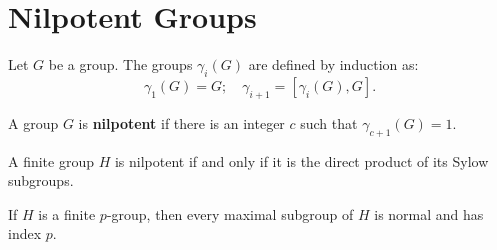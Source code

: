 \section{Nilpotent Groups}

\begin{definition}
    Let $G$ be a group. The groups $\gamma_i(G)$ are defined by induction as:
    $$
    \gamma_1(G) = G; \quad \gamma_{i+1} = \left[\gamma_i(G), G\right].
    $$ 
\end{definition}

\begin{definition}
    A group $G$ is \textbf{nilpotent} if there is an integer $c$ such that $\gamma_{c+1}(G) = 1$. 
\end{definition}

\begin{theorem}
    \cite[p.~116]{RotmanITG}
    A finite group $H$ is nilpotent if and only if it is the direct product of its Sylow subgroups.
\end{theorem}

\begin{theorem}
    \cite[p.~117]{RotmanITG}
    \label{S1NG:maxsub}
    If $H$ is a finite $p$-group, then every maximal subgroup of $H$ is normal and has index $p$.
\end{theorem}

